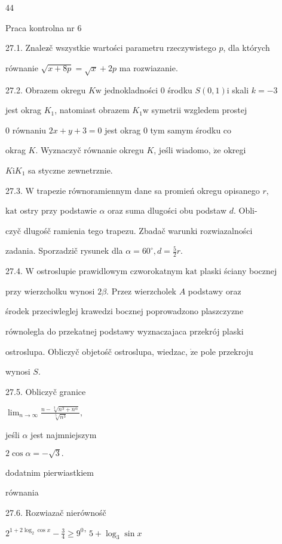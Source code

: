 \documentclass[a4paper,12pt]{article}
\begin{document}
44

Praca kontrolna nr 6

27.1. Znalez$\acute{}$č wszystkie wartości parametru rzeczywistego $p$, dla których

równanie $\sqrt{x+8p}=\sqrt{x}+2p$ ma rozwiazanie.

27.2. Obrazem okregu $K\mathrm{w}$ jednokladności $0$ środku $S(0,1)\mathrm{i}$ skali $k=-3$

jest okrag $K_{1}$, natomiast obrazem $K_{1} \mathrm{w}$ symetrii wzgledem prostej

$0$ równaniu $2x+y+3 = 0$ jest okrag $0$ tym samym środku co

okrag $K$. Wyznaczyč równanie okregu $K$, jeśli wiadomo, $\dot{\mathrm{z}}\mathrm{e}$ okregi

$K\mathrm{i}K_{1}$ sa styczne zewnetrznie.

27.3. $\mathrm{W}$ trapezie równoramiennym dane sa promień okregu opisanego $r,$

$\mathrm{k}\mathrm{a}\mathrm{t}$ ostry przy podstawie $\alpha$ oraz suma dlugości obu podstaw $d$. Obli-

czyč dlugośč ramienia tego trapezu. Zbadač warunki rozwiazalności

zadania. Sporzadzič rysunek dla $\alpha=60^{\circ}, d=\displaystyle \frac{5}{2}r.$

27.4. $\mathrm{W}$ ostroslupie prawidlowym czworokatnym $\mathrm{k}\mathrm{a}\mathrm{t}$ plaski ściany bocznej

przy wierzcholku wynosi $ 2\beta$. Przez wierzcholek $A$ podstawy oraz

środek przeciwleglej krawedzi bocznej poprowadzono plaszczyzne

równolegla do przekatnej podstawy wyznaczajaca przekrój plaski

ostroslupa. Obliczyč objetośč ostroslupa, wiedzac, $\dot{\mathrm{z}}\mathrm{e}$ pole przekroju

wynosi $S.$

27.5. Obliczyč granice

$\displaystyle \lim_{n\rightarrow\infty}\frac{n-\sqrt[3]{n^{3}+n^{\alpha}}}{\sqrt[5]{n^{3}}},$

jeśli $\alpha$ jest najmniejszym

$2\cos\alpha=-\sqrt{3}.$

dodatnim pierwiastkiem

równania

27.6. Rozwiazač nierównośč

$2^{1+2\log_{2}\cos x}-\displaystyle \frac{3}{4}\geq 9^{0}$' $5+\log_{3}\sin x$
\end{document}
